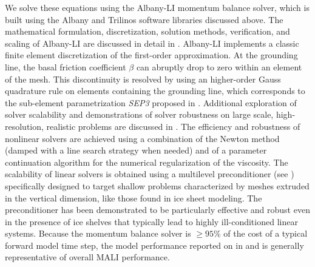 We solve these equations using the Albany-LI momentum balance solver, which is built using the Albany and Trilinos software libraries discussed above. The mathematical formulation, discretization, solution methods, verification, and scaling of Albany-LI are discussed in detail in \cite{tezaur2015a}. 
Albany-LI implements a classic finite element discretization of the first-order approximation. At the grounding line, the basal friction coefficient $\beta$ can abruptly drop to zero within an element of the mesh. This discontinuity is resolved by using an higher-order Gauss quadrature rule on elements containing the grounding line, which corresponds to the  sub-element parametrization \emph{SEP3} proposed in \cite{Seroussi2014a}.
Additional exploration of solver scalability and demonstrations of solver robustness on large scale, high-resolution, realistic problems are discussed in \cite{tezaur2015b}. 
The efficiency and robustness of nonlinear solvers are achieved using a combination of the Newton method (damped with a line search strategy when needed) and of a parameter continuation algorithm for the numerical regularization of the viscosity. 
The scalability of linear solvers is obtained using a multilevel preconditioner (see \cite{Tuminaro2016}) specifically designed to target shallow problems characterized by meshes extruded in the vertical dimension, like those found in ice sheet modeling.
The preconditioner has been demonstrated to be particularly effective and robust even in the presence of ice shelves that typically lead to highly ill-conditioned linear systems. Because the momentum balance solver is $\geq95\%$ of the cost of a typical forward model time step, the model performance reported on in \cite{tezaur2015a,tezaur2015b} and \cite{Tuminaro2016} is generally representative of overall MALI performance.   

